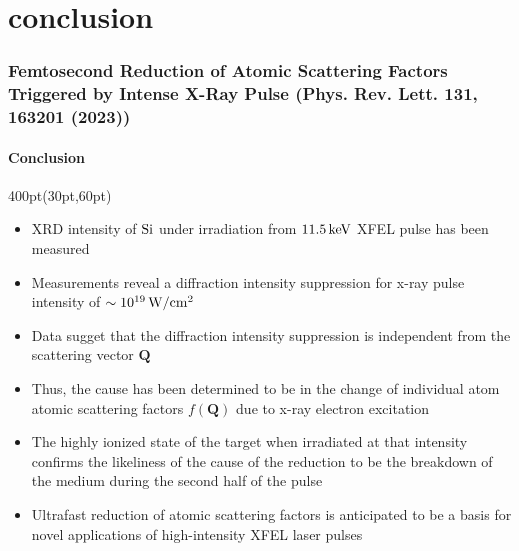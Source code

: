 
\section{conclusion}

\begin{frame}
\frametitle{Femtosecond Reduction of Atomic Scattering Factors Triggered by
Intense X-Ray Pulse \small (Phys. Rev. Lett. \textbf{131}, 163201 (2023))}
\framesubtitle{Conclusion}


\small
\begin{textblock*}{400pt}(30pt,60pt)
\begin{itemize}
\footnotesize
\item XRD intensity of $\rm Si$ under irradiation from $11.5\,\rm keV$ 
XFEL pulse has been measured
\item Measurements reveal a diffraction intensity suppression 
for x-ray pulse intensity of $\sim 10^{19}\,\rm W/cm^2$ 
\item Data sugget that the diffraction intensity suppression is independent
from the scattering vector $\boldsymbol{Q}$
\item Thus, the cause has been determined to be in the change of individual
atom atomic scattering factors $f(\boldsymbol{Q})$ due to x-ray
electron excitation
\item The highly ionized state of the target when irradiated at that intensity
confirms the likeliness of the cause of the reduction to be 
the breakdown of the medium during the second half of the pulse

\vspace{20pt}

\item Ultrafast reduction of atomic scattering factors is anticipated to be 
a basis for novel applications of high-intensity XFEL laser pulses
\end{itemize}

\end{textblock*}



\end{frame}
